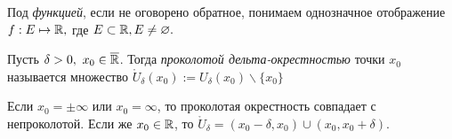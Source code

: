 \begin{definition}
    Под \textit{функцией}, если не оговорено обратное, понимаем однозначное отображение $f: E \mapsto \mathbb{R},$ где $E \subset \mathbb{R}, E\neq \varnothing.$
\end{definition}
\begin{definition}
    Пусть $\delta > 0, \  x_{0} \in \overline{\mathbb{R}}$. Тогда \textit{проколотой дельта-окрестностью} точки $x_{0}$ называется множество $\mathring{U}_{\delta} (x_{0}) := U_{\delta} (x_{0}) \backslash \{ x_{0} \}$
\end{definition}
\begin{note} Если $x_0 = \pm \infty$ или $x_0 = \infty$, то проколотая окрестность совпадает с непроколотой. Если же $x_{0} \in \mathbb{R}$, то $\mathring{U}_{\delta} = (x_0 -\delta, x_0 ) \cup (x_0, x_0 + \delta)$.
\end{note}
